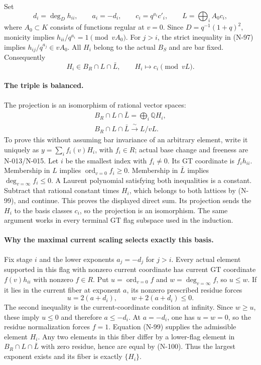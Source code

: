 Set
\[
 d_i=\deg_Dh_{ii},\qquad a_i=-d_i,\qquad
 c_i=q^{a_i}c'_i,\qquad
 L=\bigoplus_i A_0c_i,
 \tag{N-98}
\]
where $A_0\subset K$ consists of functions regular at $v=0$.
Since $D=q^{-1}(1+q)^2$, monicity implies
$h_{ii}/q^{a_i}=1\pmod {vA_0}$.
For $j>i$, the strict inequality in (N-97) implies
$h_{ij}/q^{a_j}\in vA_0$.
All $H_i$ belong to the actual $B_S$ and are bar fixed.
Consequently
\[
 H_i\in B_R\cap L\cap\bar L,
 \qquad H_i\longmapsto c_i\pmod {vL}.
 \tag{N-99}
\]

\paragraph{The triple is balanced.}
The projection is an isomorphism of rational vector spaces:
\[
 \begin{gathered}
 B_R\cap L\cap\bar L=\bigoplus_i\mathbb QH_i,\\
 B_R\cap L\cap\bar L\xrightarrow{\ \sim\ }L/vL.
 \end{gathered}
 \tag{N-100}
\]
To prove this without assuming bar invariance of an arbitrary element,
write it uniquely as $y=\sum_i f_i(v)H_i$, with $f_i\in R$;
actual base change and freeness are N-013/N-015.  Let $i$ be the
smallest index with $f_i\ne0$.  Its GT coordinate is $f_i h_{ii}$.
Membership in $L$ implies $\operatorname{ord}_{v=0}f_i\ge0$.
Membership in $\bar L$ implies $\deg_{v=\infty}f_i\le0$.
A Laurent polynomial satisfying both inequalities is a constant.
Subtract that rational constant times $H_i$, which belongs to both
lattices by (N-99), and continue.  This proves the displayed direct
sum.  Its projection sends the $H_i$ to the basis classes $c_i$,
so the projection is an isomorphism.  The same argument works in
every terminal GT flag subspace used in the induction.

\paragraph{Why the maximal current scaling selects exactly this basis.}
Fix stage $i$ and the lower exponents $a_j=-d_j$ for $j>i$.
Every actual element supported in this flag with nonzero current
coordinate has current GT coordinate $f(v)h_{ii}$ with nonzero $f\in R$.
Put $u=\operatorname{ord}_{v=0}f$ and $w=\deg_{v=\infty}f$,
so $u\le w$.  If it lies in the current fiber at exponent $a$,
its nonzero prescribed residue forces
\[
 u=2(a+d_i),\qquad
 w+2(a+d_i)\le0.
 \tag{N-101}
\]
The second inequality is the current-coordinate condition at infinity.
Since $w\ge u$, these imply $u\le0$ and therefore $a\le-d_i$.
At $a=-d_i$, one has $u=w=0$, so the residue normalization forces
$f=1$.  Equation (N-99) supplies the admissible element $H_i$.
Any two elements in this fiber differ by a lower-flag element in
$B_R\cap L\cap\bar L$ with zero residue, hence are equal by
(N-100).  Thus the largest exponent exists and its fiber is exactly
$\{H_i\}$.

